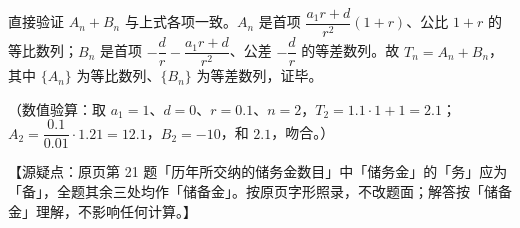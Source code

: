 \begin{answer}
直接验证 $A_n+B_n$ 与上式各项一致。$A_n$ 是首项 $\dfrac{a_1r+d}{r^2}(1+r)$、公比 $1+r$ 的等比数列；$B_n$ 是首项 $-\dfrac dr-\dfrac{a_1r+d}{r^2}$、公差 $-\dfrac dr$ 的等差数列。故 $T_n=A_n+B_n$，其中 $\{A_n\}$ 为等比数列、$\{B_n\}$ 为等差数列，证毕。

（数值验算：取 $a_1=1$、$d=0$、$r=0.1$、$n=2$，$T_2=1.1\cdot1+1=2.1$；$A_2=\dfrac{0.1}{0.01}\cdot1.21=12.1$，$B_2=-10$，和 $2.1$，吻合。）

【源疑点：原页第 21 题「历年所交纳的储务金数目」中「储务金」的「务」应为「备」，全题其余三处均作「储备金」。按原页字形照录，不改题面；解答按「储备金」理解，不影响任何计算。】


\end{answer}